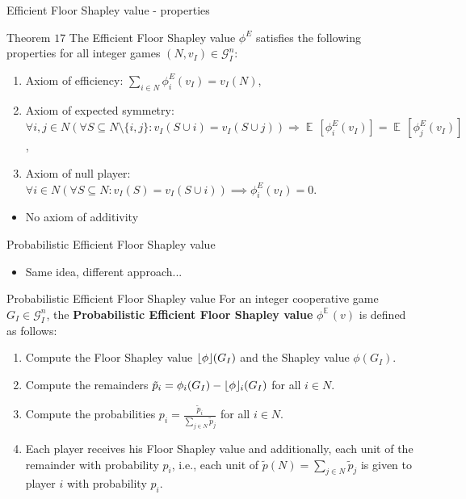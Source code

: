 \documentclass{beamer}
\newcommand{\floor}[1]{\left\lfloor #1 \right\rfloor}
\newcommand{\floorphi}{\ensuremath{\floor{\phi}\hspace{-0.5ex}}}
\DeclareMathOperator{\E}{\mathbb{E}\,}
\begin{document}
\begin{frame}{Efficient Floor Shapley value - properties}

    \begin{block}{Theorem $17$}
        The Efficient Floor Shapley value $\phi^E$ satisfies the following properties for all integer games $(N,v_I) \in \mathcal{G}_I^n$:
        \begin{enumerate}
            \item Axiom of efficiency: $\sum_{i \in N}\phi_{i}^E(v_I) = v_I(N)$,
            \item Axiom of expected symmetry: $\forall i,j \in N (\forall S \subseteq N \setminus \{i,j\}: v_I(S \cup i) = v_I(S \cup j)) \Rightarrow \E[\phi^E_{i}(v_I)] = \E[\phi^E_{j}(v_I)]$,
            \item Axiom of null player: $\forall i \in N(\forall S \subseteq N: v_I(S)=v_I(S \cup i)) \implies \phi_{i}^E(v_I) = 0$.
        \end{enumerate}
    \end{block}


    \begin{itemize}
        \item No axiom of additivity %
    \end{itemize}
\end{frame}



\begin{frame}{Probabilistic Efficient Floor Shapley value}
    \begin{itemize}
        \item Same idea, different approach...
    \end{itemize}


    \begin{block}{Probabilistic Efficient Floor Shapley value}
        For an integer cooperative game $G_I \in \mathcal{G}_I^n$, the \textbf{Probabilistic Efficient Floor Shapley value} $\phi^{\E}(v)$ is defined as follows:
        \begin{enumerate}
            \item Compute the Floor Shapley value $\floorphi(G_I)$ and the Shapley value $\phi(G_I)$.
            \item Compute the remainders $\tilde{p}_i = \phi_i(G_I) - \floorphi_i(G_I)$ for all $i \in N$.
            \item Compute the probabilities $p_i = \frac{\tilde{p}_i}{\sum_{j \in N} \tilde{p}_j}$ for all $i \in N$.
            \item Each player receives his Floor Shapley value and additionally, each unit of the remainder with probability $p_i$, i.e., each unit of $\tilde{p}(N)=\sum_{j \in N} \tilde{p}_j$ is given to player $i$ with probability $p_i$.
        \end{enumerate}
    \end{block}
\end{frame}
\end{document}
